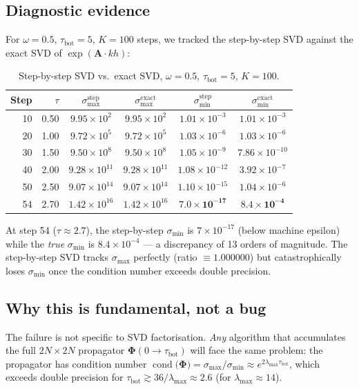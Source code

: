 \documentclass[11pt,a4paper]{article}
\newcommand{\cond}{\operatorname{cond}}
\newcommand{\mat}[1]{\mathbf{#1}}
\newcommand{\tbot}{\tau_{\mathrm{bot}}}
\theoremstyle{definition}
\begin{document}
\subsection{Diagnostic evidence}
For $\omega=0.5$, $\tbot=5$, $K=100$ steps, we tracked the step-by-step SVD
against the exact SVD of $\exp(\mat{A}\cdot k h)$:

\begin{table}[h]\centering
\caption{Step-by-step SVD vs.\ exact SVD,
$\omega=0.5$, $\tbot=5$, $K=100$.}\label{tab:svd_track}
\begin{tabular}{r|r|cc|cc}
\toprule
Step & $\tau$ & $\sigma_{\max}^{\text{step}}$ & $\sigma_{\max}^{\text{exact}}$
     & $\sigma_{\min}^{\text{step}}$ & $\sigma_{\min}^{\text{exact}}$ \\
\midrule
 10 & 0.50 & $9.95\times 10^{2}$  & $9.95\times 10^{2}$  & $1.01\times 10^{-3}$ & $1.01\times 10^{-3}$ \\
 20 & 1.00 & $9.72\times 10^{5}$  & $9.72\times 10^{5}$  & $1.03\times 10^{-6}$ & $1.03\times 10^{-6}$ \\
 30 & 1.50 & $9.50\times 10^{8}$  & $9.50\times 10^{8}$  & $1.05\times 10^{-9}$ & $7.86\times 10^{-10}$ \\
 40 & 2.00 & $9.28\times 10^{11}$ & $9.28\times 10^{11}$ & $1.08\times 10^{-12}$ & $3.92\times 10^{-7}$ \\
 50 & 2.50 & $9.07\times 10^{14}$ & $9.07\times 10^{14}$ & $1.10\times 10^{-15}$ & $1.04\times 10^{-6}$ \\
 54 & 2.70 & $1.42\times 10^{16}$ & $1.42\times 10^{16}$ & $\mathbf{7.0\times 10^{-17}}$ & $\mathbf{8.4\times 10^{-4}}$ \\
\bottomrule
\end{tabular}
\end{table}

At step 54 ($\tau\approx 2.7$), the step-by-step $\sigma_{\min}$ is
$7\times 10^{-17}$ (below machine epsilon) while the \emph{true}
$\sigma_{\min}$ is $8.4\times 10^{-4}$ --- a discrepancy of 13 orders of
magnitude.  The step-by-step SVD tracks $\sigma_{\max}$ perfectly (ratio
$\equiv 1.000000$) but catastrophically loses $\sigma_{\min}$ once the
condition number exceeds double precision.

\subsection{Why this is fundamental, not a bug}
The failure is not specific to SVD factorisation.  \emph{Any} algorithm
that accumulates the full $2N\times 2N$ propagator $\mat{\Phi}(0\to\tbot)$
will face the same problem: the propagator has condition number
$\cond\bigl(\mat{\Phi}\bigr) = \sigma_{\max}/\sigma_{\min} \approx
e^{2\lambda_{\max}\tbot}$, which exceeds double precision for
$\tbot \gtrsim 36/\lambda_{\max} \approx 2.6$ (for $\lambda_{\max}\approx 14$).
\end{document}
